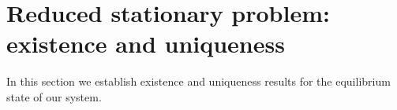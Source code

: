 \documentclass[11pt]{article}
\theoremstyle{definition}
\theoremstyle{remark}
\newcommand{\STO}{\mathcal{L}}
\newcommand{\Gammahat}{\widehat{\Gamma}}
\begin{document}
%


\section{Reduced stationary problem: existence and uniqueness}
\label{4}
In this section we establish existence and uniqueness results for the equilibrium state of our system.
\end{document}
